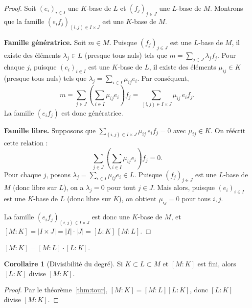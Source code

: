 \documentclass[12pt,a4paper,openany]{book}
\theoremstyle{definition}
\newtheorem{corollaire}{Corollaire}[chapter]
\begin{document}
\begin{proof}
Soit $(e_i)_{i \in I}$ une $K$-base de $L$ et $(f_j)_{j \in J}$ une $L$-base
de $M$. Montrons que la famille $(e_i f_j)_{(i,j) \in I \times J}$ est une
$K$-base de $M$.

\textbf{Famille génératrice.} Soit $m \in M$. Puisque $(f_j)_{j \in J}$ est
une $L$-base de $M$, il existe des éléments $\lambda_j \in L$ (presque tous
nuls) tels que $m = \sum_{j \in J} \lambda_j f_j$. Pour chaque $j$, puisque
$(e_i)_{i \in I}$ est une $K$-base de $L$, il existe des éléments
$\mu_{ij} \in K$ (presque tous nuls) tels que $\lambda_j = \sum_{i \in I}
\mu_{ij} e_i$. Par conséquent,
\[
  m = \sum_{j \in J} \left(\sum_{i \in I} \mu_{ij} e_i\right) f_j
    = \sum_{(i,j) \in I \times J} \mu_{ij}\, e_i f_j.
\]
La famille $(e_i f_j)$ est donc génératrice.

\textbf{Famille libre.} Supposons que
$\sum_{(i,j) \in I \times J} \mu_{ij}\, e_i f_j = 0$ avec $\mu_{ij} \in K$.
On réécrit cette relation :
\[
  \sum_{j \in J} \left(\sum_{i \in I} \mu_{ij} e_i\right) f_j = 0.
\]
Pour chaque $j$, posons $\lambda_j = \sum_{i \in I} \mu_{ij} e_i \in L$.
Puisque $(f_j)_{j \in J}$ est une $L$-base de $M$ (donc libre sur $L$), on a
$\lambda_j = 0$ pour tout $j \in J$. Mais alors, puisque $(e_i)_{i \in I}$ est
une $K$-base de $L$ (donc libre sur $K$), on obtient $\mu_{ij} = 0$ pour tous
$i, j$.

La famille $(e_i f_j)_{(i,j) \in I \times J}$ est donc une $K$-base de $M$, et
$[M:K] = |I \times J| = |I| \cdot |J| = [L:K]\,[M:L]$.
\end{proof}

\begin{center}
\quad
{}\quad $[M:K] = [M:L]\cdot [L:K]$.
\end{center}

\begin{corollaire}[Divisibilité du degré]\label{cor:divisibilite-degre}
Si $K \subset L \subset M$ et $[M:K]$ est fini, alors $[L:K]$ divise $[M:K]$.
\end{corollaire}

\begin{proof}
Par le théorème~\ref{thm:tour}, $[M:K] = [M:L][L:K]$, donc $[L:K]$ divise
$[M:K]$.
\end{proof}
\end{document}
